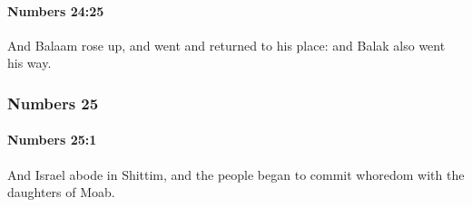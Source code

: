 		\paragraph{Numbers 24:25} %
			\label{NUMBERS-24-25}

			And Balaam rose up, and went and returned to his place: and Balak also went his way.

	\subsubsection{Numbers 25} %
		\label{NUMBERS-25}

		\paragraph{Numbers 25:1} %
			\label{NUMBERS-25-1}

			And Israel abode in Shittim, and the people began to commit whoredom with the daughters of Moab.

